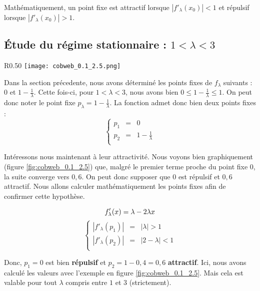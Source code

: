 Mathématiquement, un point fixe est attractif lorsque $|f'_\lambda(x_0)| < 1$ et répulsif lorsque $|f'_\lambda(x_0)| > 1$.

\subsection{\'Etude du régime stationnaire : \texorpdfstring{$1 < \lambda < 3$}{Lg}}
\begin{wrapfigure}{R}{0.50\textwidth}
    \centering
    \texttt{[image: cobweb\_0.1\_2.5.png]}
    \caption{\label{fig:cobweb_0.1_2.5}$\lambda = 2.5$ et $u_0 = 0.1$}
\end{wrapfigure}
Dans la section précedente, nous avons déterminé les points fixes de $f_\lambda$ suivants : $0$ et $1 - \frac{1}{\lambda}$. Cette fois-ci, pour $1 < \lambda < 3$, nous avons bien $ 0 \leq 1 - \frac{1}{\lambda} \leq 1$. On peut donc noter le point fixe $p_\lambda = 1 - \frac{1}{\lambda}$. La fonction admet donc bien deux points fixes :
$$
    \left\{
    \begin{array}{rcl}
            p_1 &=& 0\\
            p_2 &=& 1 - \frac{1}{\lambda}\\
    \end{array}
    \right.
$$

Intéressons nous maintenant à leur attractivité. Nous voyons bien graphiquement (figure \ref{fig:cobweb_0.1_2.5}) que, malgré le premier terme proche du point fixe $0$, la suite converge vers $0,6$. On peut donc supposer que $0$ est répulsif et $0,6$ attractif. Nous allons calculer mathématiquement les points fixes afin de confirmer cette hypothèse.

$$f'_\lambda(x)=\lambda-2\lambda x\\$$
$$\left\{
    \begin{array}{rcl}
            |f'_\lambda(p_1)| &=& |\lambda| > 1\\[5pt]
            |f'_\lambda(p_2)| &=& |2 - \lambda| < 1\\
    \end{array}
    \right.$$

Donc, $p_1 = 0$ est bien \textbf{répulsif} et $p_2 = 1 - 0,4 = 0,6$ \textbf{attractif}. Ici, nous avons calculé les valeurs avec l'exemple en figure \ref{fig:cobweb_0.1_2.5}. Mais cela est valable pour tout $\lambda$ compris entre $1$ et $3$ (strictement).

\newpage
